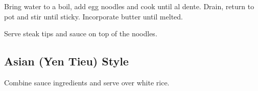 \begin{recipe}
Bring water to a boil, add egg noodles and cook until al dente. Drain, return to pot and stir until sticky. Incorporate butter until melted.

Serve steak tips and sauce on top of the noodles.

\subsection{Asian (Yen Tieu) Style}


Combine sauce ingredients and serve over white rice.

\end{recipe}
